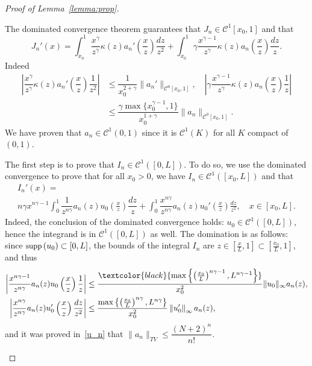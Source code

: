 \documentclass[10pt]{amsart}
\theoremstyle{definition}\newtheorem{defi}[theo]{Definition}\newtheorem{rema}[theo]{Remark}\newtheorem{exam}[theo]{Example}\newtheorem{exem}[theo]{Example}\newtheorem{nota}[theo]{Notation}
\newcommand*\dst{\displaystyle}
\newcommand{\clC}{\mathcal{C}}
\newcommand{\Mag}[1]{\textcolor{black}{#1}}
\newcommand*\supp{{\mbox{\small\rm supp}}\,}
\begin{document}
\begin{proof}[Proof of Lemma~\ref{lemma:prop}]
\begin{enumerate}
The dominated convergence theorem guarantees that $J_n\in \clC^1[x_0,1]$ and that
\begin{equation*}
J_n'(x)= \dst\int_{x_0}^{1} \dfrac{x^{\gamma}}{z^{\gamma}} \kappa(z) a_n'\left(\dfrac{x}{z}\right) \dfrac{dz}{z^2} + \dst\int_{x_0}^{1} \gamma\dfrac{x^{\gamma-1}}{z^{\gamma}} \kappa(z) a_n\left(\dfrac{x}{z}\right) \dfrac{dz}{z}.
\end{equation*}
Indeed
\begin{align*}
\left|\dfrac{x^{\gamma}}{z^{\gamma}} \kappa(z) a_n'\left(\dfrac{x}{z}\right) \dfrac{1}{z^2}\right|
&\leq \dfrac{1}{x_0^{2+\gamma}}\|a_n'\|_{\clC^0[x_0,1]}, \quad
\left|\gamma\dfrac{x^{\gamma-1}}{z^{\gamma}} \kappa(z) a_n\left(\dfrac{x}{z}\right) \dfrac{1}{z}\right|\\
&\leq \dfrac{\gamma \max\{x_0^{\gamma-1}, 1\}}{x_0^{1+\gamma}}\|a_n\|_{\clC^0[x_0,1]}.
\end{align*}
We have proven that $a_n\in\clC^1(0,1)$ since it is $\clC^1(K)$ for all $K$ compact of $(0,1)$.


The first step is to prove that $I_n \in \clC^1([0,L])$. To do so, we use the dominated convergence to prove that for all $x_0>0$, we have $I_n \in \clC^1([x_0,L])$ and that
\begin{multline}\label{I_n'}
I_n'(x) =\\
n \gamma x^{n\gamma-1} \dst\int_0^{1} \dfrac{1}{z^{n\gamma}}a_n(z) u_0\left(\frac{x}{z}\right) \dfrac{dz}{z} +\dst\int_0^{1}
\dfrac{x^{n\gamma}}{z^{n\gamma}} a_n(z) u_0'\left(\frac{x}{z}\right)
\frac{dz}{z^2}, \quad x\in [x_0,L].
\end{multline}
Indeed, the conclusion of the dominated convergence holds: $u_0 \in \clC^1([0,L])$, hence the integrand is in $\clC^1([0,L])$ as well. The domination is as follows: since $\supp(u_0)\subset [0,L]$, the bounds of the integral $I_n$ are $z\in \left[\frac{x}{L},1\right] \subset \left[\frac{x_0}{L},1\right]$, and thus
\begin{align*}
\left| \frac{x^{n\gamma-1} }{z^{n\gamma}}a_n(z) u_0\left(\frac{x}{z}\right)
\frac{1}{z}\right| &\leq \dfrac{\Mag{\max\left\{\left(\frac{x_0}{L}\right)^{n\gamma-1}, L^{n\gamma-1}\right\}}}{x_0^{2} }
\|u_0\|_{\infty}a_n(z),
\\
\left|\frac{x^{n\gamma}}{z^{n\gamma}} a_n(z) u_0'\left(\frac{x}{z}\right) \dfrac{dz}{z^2}\right| &\leq \frac{\max\left\{\left(\frac{x_0}{L}\right)^{n\gamma}, L^{n\gamma}\right\}}{x_0^{2}}
\left\|u_0'\right\|_{\infty} a_n(z),
\end{align*}
and it was proved in~\eqref{u_n} that $\|a_n\|_{TV} \leq \dfrac{(N+2)^n}{n!}$.


\end{enumerate}
\end{proof}
\end{document}
